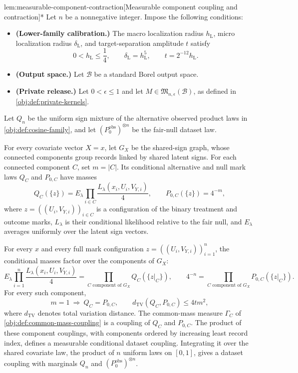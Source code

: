 \begin{lemmav}{lem:measurable-component-contraction}[Measurable component coupling and contraction]*
Let \(n\) be a nonnegative integer. Impose the following conditions:
\begin{itemize}
\item \textbf{(Lower-family calibration.)} The macro localization radius \(h_{\mathrm L}\), micro localization radius \(\delta_{\mathrm L}\), and target-separation amplitude \(t\) satisfy
\[
0<h_{\mathrm L}\le\frac14,
\qquad
\delta_{\mathrm L}=h_{\mathrm L}^{5},
\qquad
t=2^{-12}h_{\mathrm L}.
\]
\item \textbf{(Output space.)} Let \(\mathcal B\) be a standard Borel output space.
\item \textbf{(Private release.)} Let \(0<\epsilon\le1\) and let \(M\in\mathfrak M_{n,\epsilon}(\mathcal B)\), as defined in \cref{obj:def:private-kernels}.
\end{itemize}
Let \(Q_n\) be the uniform sign mixture of the alternative observed product laws in \cref{obj:def:cosine-family}, and let \((P_0^{\mathrm{obs}})^{\otimes n}\) be the fair-null dataset law.

For every covariate vector \(X=x\), let \(G_X\) be the shared-sign graph, whose connected components group records linked by shared latent signs. For each connected component \(C\), set \(m=|C|\). Its conditional alternative and null mark laws \(Q_C\) and \(P_{0,C}\) have masses
\[
Q_C(\{z\})
 = E_\lambda\prod_{i\in C}
   \frac{L_\lambda(x_i,U_i,V_{Y,i})}{4},
\qquad
P_{0,C}(\{z\})=4^{-m},
\]
where \(z=((U_i,V_{Y,i}))_{i\in C}\) is a configuration of the binary treatment and outcome marks, \(L_\lambda\) is their conditional likelihood relative to the fair null, and \(E_\lambda\) averages uniformly over the latent sign vectors.

For every \(x\) and every full mark configuration \(z=((U_i,V_{Y,i}))_{i=1}^n\), the conditional masses factor over the components of \(G_X\):
\[
E_\lambda\prod_{i=1}^n
  \frac{L_\lambda(x_i,U_i,V_{Y,i})}{4}
 = \prod_{C\text{ component of }G_X} Q_C(\{z|_C\}),
\qquad
4^{-n}
 = \prod_{C\text{ component of }G_X} P_{0,C}(\{z|_C\}).
\]
For every such component,
\[
m=1\ \Longrightarrow\ Q_C=P_{0,C},
\qquad
d_{\mathrm{TV}}(Q_C,P_{0,C})\le4tm^2,
\]
where \(d_{\mathrm{TV}}\) denotes total variation distance. The common-mass measure \(\Gamma_C\) of \cref{obj:def:common-mass-coupling} is a coupling of \(Q_C\) and \(P_{0,C}\). The product of these component couplings, with components ordered by increasing least record index, defines a measurable conditional dataset coupling. Integrating it over the shared covariate law, the product of \(n\) uniform laws on \([0,1]\), gives a dataset coupling with marginals \(Q_n\) and \((P_0^{\mathrm{obs}})^{\otimes n}\).


\end{lemmav}
